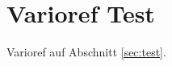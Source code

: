 \documentclass[french,german]{article}
\begin{document}
\section{Varioref Test \label{sec:test}}

Varioref auf Abschnitt \vref{sec:test}.
\end{document}
